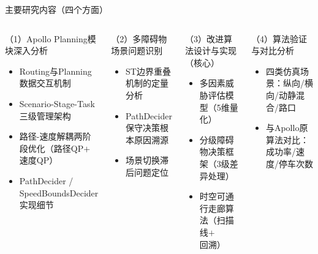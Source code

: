 \documentclass{beamer}
\begin{document}
\begin{frame}{主要研究内容（四个方面）}
  \begin{columns}[T]
    \begin{block}{（1）Apollo Planning模块深入分析}
      \begin{itemize}
        \item Routing与Planning数据交互机制
        \item Scenario-Stage-Task三级管理架构
        \item 路径-速度解耦两阶段优化（路径QP$+$速度QP）
        \item PathDecider / SpeedBoundsDecider实现细节
      \end{itemize}
    \end{block}
    \vspace{0.1em}
    \begin{block}{（2）多障碍物场景问题识别}
      \begin{itemize}
        \item ST边界重叠机制的定量分析
        \item PathDecider保守决策根本原因溯源
        \item 场景切换滞后问题定位
      \end{itemize}
    \end{block}

    \begin{block}{（3）\alert{改进算法设计与实现（核心）}}
      \begin{itemize}
        \item 多因素威胁评估模型（5维量化）
        \item 分级障碍物决策框架（3级差异处理）
        \item 时空可通行走廊算法（扫描线$+$回溯）
      \end{itemize}
    \end{block}
    \vspace{0.05em}
    \begin{block}{（4）算法验证与对比分析}
      \begin{itemize}
        \item 四类仿真场景：纵向/横向/动静混合/路口
        \item 与Apollo原算法对比：成功率/速度/停车次数
      \end{itemize}
    \end{block}
  \end{columns}
\end{frame}
\end{document}
